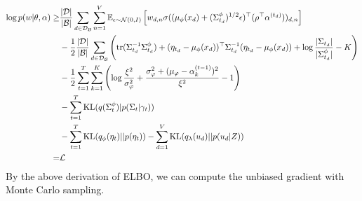 \begin{align}\label{eq:ch6_elbo2}
\log p(w|\theta,\alpha)\geq&\frac{|\mathcal{D}|}{|\mathcal{B}|}\sum_{d\in\mathcal{D}_{\mathcal{B}}}\sum_{n=1}^{V}\mathbb{E}_{\epsilon\sim\mathcal{N}(0,I)}\left[w_{d,n}\sigma((\mu_{\phi}(x_d)+(\Sigma^{\phi}_{t_d})^{1/2}\epsilon)^\top(\rho^\top\alpha^{(t_d)}))_{d,n}\right]\notag\\
&-\frac{1}{2}\frac{|\mathcal{D}|}{|\mathcal{B}|}\sum_{d\in\mathcal{D}_{\mathcal{B}}}\left(\text{tr}(\Sigma_{t_d}^{-1}\Sigma_{t_d}^{\phi})+(\eta_{t_d}-\mu_{\phi}(x_d))^\top\Sigma_{t_d}^{-1}(\eta_{t_d}-\mu_{\phi}(x_d))+\log\frac{|\Sigma_{t_d}|}{|\Sigma^{\phi}_{t_d}|}-K\right)\notag\\
&-\frac{1}{2}\sum_{t=1}^{T}\sum_{k=1}^{K}\left(\log\frac{\xi^2}{\sigma_\varphi^2}+\frac{\sigma_\varphi^2+(\mu_\varphi-\alpha_k^{(t-1)})^2}{\xi^2}-1\right)\notag\\
&-\sum_{t=1}^{T}\text{KL}(q(\Sigma^{\phi}_{t})|p(\Sigma_{t}|\gamma_{t}))\notag\\
&-\sum_{t=1}^{T}\text{KL}(q_{\phi}(\eta_t)||p(\eta_t))-\sum_{d=1}^{V}\text{KL}(q_\lambda(u_d)||p(u_d|Z))\notag\\
=&\mathcal{L}
\end{align}
By the above derivation of ELBO, we can compute the unbiased gradient with Monte Carlo sampling. \\
